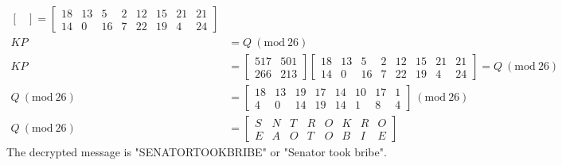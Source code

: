 \documentclass{../mathhomework}
\newcommand{\Mod}[1]{\ (\mathrm{mod}\ #1)}
\begin{document}
\begin{problem}
\begin{solution}
\begin{align}
\begin{bmatrix}
            \end{bmatrix} = \begin{bmatrix}
                18 & 13 & 5 & 2 & 12 & 15 & 21 & 21 \\
                14 & 0 & 16 & 7 & 22 & 19 & 4 & 24
            \end{bmatrix} \\
            KP & = Q \Mod{26} \\
            KP & = \begin{bmatrix}
                517 & 501 \\ 266 & 213
            \end{bmatrix} \begin{bmatrix}
                18 & 13 & 5 & 2 & 12 & 15 & 21 & 21 \\
                14 & 0 & 16 & 7 & 22 & 19 & 4 & 24
            \end{bmatrix} = Q \Mod{26}\\
            Q \Mod{26} & = \begin{bmatrix}
                18 & 13 & 19 & 17 & 14 & 10 & 17 & 1 \\
                4 & 0 & 14 & 19 & 14 & 1 & 8 & 4
            \end{bmatrix} \Mod{26} \\
            Q \Mod{26} & = \begin{bmatrix}
                S & N &  T & R & O & K & R & O\\
                E & A & O & T & O & B & I & E
            \end{bmatrix}
        \end{align}
        The decrypted message is "SENATORTOOKBRIBE" or "Senator took bribe".
    \end{solution}
\end{problem}
\end{document}
